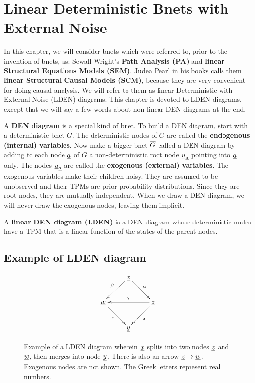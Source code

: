 \chapter{Linear Deterministic Bnets 
with External 
Noise}\label{ch-linear-sys}

In this chapter, we will consider 
bnets which were referred to,
prior to the invention of bnets, as:
Sewall Wright's {\bf Path Analysis (PA)}
 and
{\bf linear Structural Equations Models (SEM)}.
Judea Pearl in his
books calls them
{\bf linear Structural Causal Models (SCM)},
because they are very 
convenient for doing causal analysis.
We will refer  to
them as linear  Deterministic with 
External Noise
 (LDEN) diagrams.
This chapter
is devoted to LDEN diagrams,
except that we will
say a few words
about non-linear DEN
diagrams at the end.


A {\bf DEN diagram}
is a special kind of bnet.
To 
build a DEN diagram,
start with a 
deterministic bnet $G$.
The deterministic
nodes of $G$ are called
the {\bf endogenous (internal) variables}.
Now make a bigger bnet $\overline{G}$
called a DEN diagram
by 
adding to each node ${\underline{a}}$ of $G$ a
non-deterministic  
root node ${\underline{u}}_{\underline{a}}$
pointing into ${\underline{a}}$ only.
The nodes ${\underline{u}}_{\underline{a}}$ are called
the {\bf exogenous (external) variables}.
The exogenous
variables make their children noisy.
They are assumed 
to be unobserved
and their TPMs are prior
probability distributions.
Since they are 
root nodes, they are 
mutually independent.
When we
draw
a DEN diagram,
we will
never draw the exogenous nodes,
leaving them implicit.

A {\bf linear DEN diagram (LDEN)} is 
a DEN diagram
whose deterministic nodes
have a TPM that is a linear 
function of the states
of the parent nodes.


\section{Example
of LDEN diagram}


\begin{figure}[h!]
$$\xymatrix{
&\rvx\ar[dl]_\beta\ar[dr]^\alp
\\
\rvw\ar[dr]_\epsilon&&\rvz\ar[ll]_\gamma\ar[dl]^\delta
\\
&\rvy
}$$
\caption{
Example of a LDEN diagram wherein
${\underline{x}}$ splits
into two nodes ${\underline{z}}$
and ${\underline{w}}$,
then merges into node ${\underline{y}}$.
There is also an arrow
${\underline{z}}\rightarrow {\underline{w}}$.
Exogenous
nodes are not shown.
The Greek letters
represent 
real numbers.
}
\label{fig-scm-diamond}
\end{figure}

